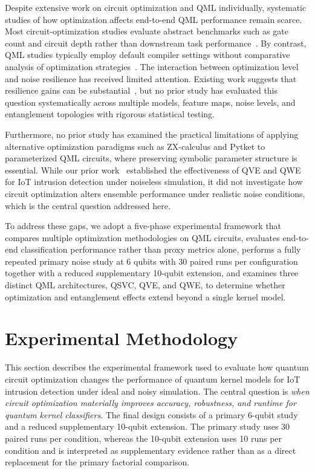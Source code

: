 \documentclass{ieeeaccess}
\begin{document}
Despite extensive work on circuit optimization and QML individually, systematic studies of how optimization affects end-to-end QML performance remain scarce. Most circuit-optimization studies evaluate abstract benchmarks such as gate count and circuit depth rather than downstream task performance~\cite{Yan2024,Fischbach2025}. By contrast, QML studies typically employ default compiler settings without comparative analysis of optimization strategies~\cite{Kalinin2023,Kumar2025}. The interaction between optimization level and noise resilience has received limited attention. Existing work suggests that resilience gains can be substantial~\cite{Murali2020}, but no prior study has evaluated this question systematically across multiple models, feature maps, noise levels, and entanglement topologies with rigorous statistical testing.

Furthermore, no prior study has examined the practical limitations of applying alternative optimization paradigms such as ZX-calculus and Pytket to parameterized QML circuits, where preserving symbolic parameter structure is essential. While our prior work~\cite{AuthorQVEQWE2025} established the effectiveness of QVE and QWE for IoT intrusion detection under noiseless simulation, it did not investigate how circuit optimization alters ensemble performance under realistic noise conditions, which is the central question addressed here.

To address these gaps, we adopt a five-phase experimental framework that compares multiple optimization methodologies on QML circuits, evaluates end-to-end classification performance rather than proxy metrics alone, performs a fully repeated primary noise study at 6 qubits with 30 paired runs per configuration together with a reduced supplementary 10-qubit extension, and examines three distinct QML architectures, QSVC, QVE, and QWE, to determine whether optimization and entanglement effects extend beyond a single kernel model.



\section{Experimental Methodology}
\label{sec:methodology}

This section describes the experimental framework used to evaluate how quantum circuit optimization changes the performance of quantum kernel models for IoT intrusion detection under ideal and noisy simulation. The central question is \emph{when circuit optimization materially improves accuracy, robustness, and runtime for quantum kernel classifiers}. The final design consists of a primary 6-qubit study and a reduced supplementary 10-qubit extension. The primary study uses 30 paired runs per condition, whereas the 10-qubit extension uses 10 runs per condition and is interpreted as supplementary evidence rather than as a direct replacement for the primary factorial comparison.
\end{document}
